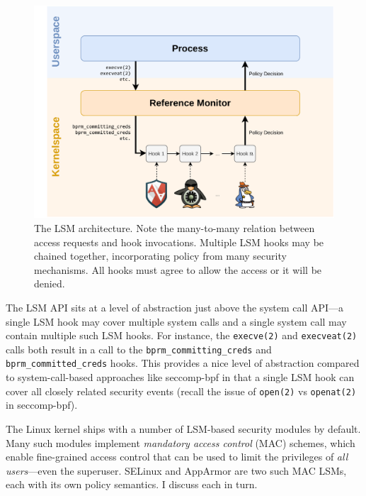 \documentclass[dvipsnames, 12pt]{article}
\begin{document}
\begin{figure}[htpb]
    \centering
    \includegraphics[width=0.8\linewidth]{figs/lsm.pdf}
    \caption{The LSM architecture. Note the many-to-many relation between access
    requests and hook invocations. Multiple LSM hooks may be chained together,
    incorporating policy from many security mechanisms. All hooks must agree to
    allow the access or it will be denied.}%
    \label{fig:lsm}
\end{figure}

The LSM API sits at a level of abstraction just above the system call API---a
single LSM hook may cover multiple system calls and a single system call may
contain multiple such LSM hooks. For instance, the \texttt{execve(2)} and
\texttt{execveat(2)} calls both result in a call to the
\texttt{bprm\_committing\_creds} and  \texttt{bprm\_committed\_creds} hooks.
This provides a nice level of abstraction compared to system-call-based
approaches like seccomp-bpf \cite{seccomp_bpf, drewry2012_seccomp_bpf} in that
a single LSM hook can cover all closely related security events (recall the
issue of \texttt{open(2)} vs \texttt{openat(2)} in seccomp-bpf).

The Linux kernel ships with a number of LSM-based security modules by default.
Many such modules implement \textit{mandatory access control} (MAC) schemes,
which enable fine-grained access control that can be used to limit the
privileges of \textit{all users}---even the superuser. SELinux
\cite{smalley2001_selinux} and AppArmor \cite{cowan2000_apparmor} are two such
MAC LSMs, each with its own policy semantics. I discuss each in turn.
\end{document}
